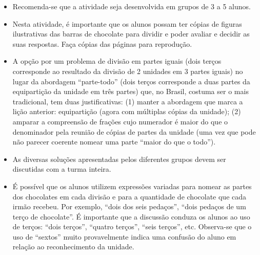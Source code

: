 \begin{orientacoes}
\begin{itemize} %
   \item Recomenda-se que a atividade seja desenvolvida em grupos de 3 a 5 alunos.
   \item Nesta atividade, é importante que os alunos possam ter cópias de figuras ilustrativas das barras de chocolate para dividir e poder avaliar e decidir as suas respostas. Faça cópias das páginas para reprodução.
   \item A opção por um problema de divisão em partes iguais (dois terços corresponde ao resultado da divisão de 2 unidades em 3 partes iguais) no lugar da abordagem ``parte-todo'' (dois terços corresponde a duas partes da equipartição da unidade em três partes) que, no Brasil, costuma ser o mais tradicional, tem duas justificativas: (1) manter a abordagem que marca a lição anterior: equipartição (agora com múltiplas cópias da unidade); (2) amparar a compreensão de frações cujo numerador é maior do que o denominador pela reunião de cópias de partes da unidade (uma vez que pode não parecer coerente nomear uma parte ``maior do que o todo'').
   \item As diversas soluções apresentadas pelos diferentes grupos devem ser discutidas com a turma inteira.
   \item É possível que os alunos utilizem expressões variadas para nomear as partes dos chocolates em cada divisão e para a quantidade de chocolate que cada irmão recebeu. Por exemplo, ``dois dos seis pedaços'', ``dois pedaços de um terço de chocolate''. É importante que a discussão conduza os alunos ao uso de terços:       ``dois terços'', ``quatro terços'', ``seis terços'', etc. Observa-se que o uso de ``sextos'' muito provavelmente indica uma confusão do aluno em relação ao reconhecimento da unidade.
  
\end{itemize} %

\end{orientacoes}


